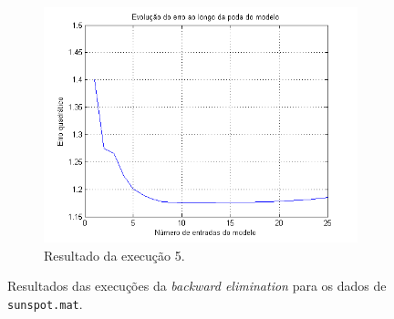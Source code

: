 \begin{figure}[H]
			\begin{subfigure}{.5\textwidth}
				  \centering
				  \includegraphics[width=1\linewidth]{image/backward5}
				  \caption{Resultado da execução 5.}
				  \label{backward5}
				\end{subfigure}	
			
			\caption{Resultados das execuções da \textit{backward elimination} para os
			dados de \texttt{sunspot.mat}.}
			\label{fig:back}
			\end{figure}


